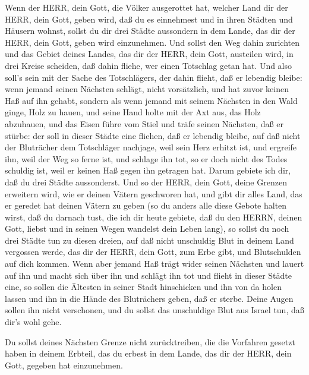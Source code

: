  Wenn der HERR, dein Gott, die Völker ausgerottet hat,
welcher Land dir der HERR, dein Gott, geben wird, daß du es einnehmest
und in ihren Städten und Häusern wohnst,  sollst du dir drei
Städte aussondern in dem Lande, das dir der HERR, dein Gott, geben wird
einzunehmen.  Und sollst den Weg dahin zurichten und das
Gebiet deines Landes, das dir der HERR, dein Gott, austeilen wird, in
drei Kreise scheiden, daß dahin fliehe, wer einen Totschlag getan hat.
 Und also soll's sein mit der Sache des Totschlägers, der
dahin flieht, daß er lebendig bleibe: wenn jemand seinen Nächsten
schlägt, nicht vorsätzlich, und hat zuvor keinen Haß auf ihn gehabt,
 sondern als wenn jemand mit seinem Nächsten in den Wald
ginge, Holz zu hauen, und seine Hand holte mit der Axt aus, das Holz
abzuhauen, und das Eisen führe vom Stiel und träfe seinen Nächsten, daß
er stürbe: der soll in dieser Städte eine fliehen, daß er lebendig
bleibe,  auf daß nicht der Bluträcher dem Totschläger
nachjage, weil sein Herz erhitzt ist, und ergreife ihn, weil der Weg so
ferne ist, und schlage ihn tot, so er doch nicht des Todes schuldig ist,
weil er keinen Haß gegen ihn getragen hat.  Darum gebiete
ich dir, daß du drei Städte aussonderst.  Und so der HERR,
dein Gott, deine Grenzen erweitern wird, wie er deinen Vätern geschworen
hat, und gibt dir alles Land, das er geredet hat deinen Vätern zu geben
 (so du anders alle diese Gebote halten wirst, daß du
darnach tust, die ich dir heute gebiete, daß du den HERRN, deinen Gott,
liebst und in seinen Wegen wandelst dein Leben lang), so sollst du noch
drei Städte tun zu diesen dreien,  auf daß nicht unschuldig
Blut in deinem Land vergossen werde, das dir der HERR, dein Gott, zum
Erbe gibt, und Blutschulden auf dich kommen.  Wenn aber
jemand Haß trägt wider seinen Nächsten und lauert auf ihn und macht sich
über ihn und schlägt ihn tot und flieht in dieser Städte eine,
 so sollen die Ältesten in seiner Stadt hinschicken und ihn
von da holen lassen und ihn in die Hände des Bluträchers geben, daß er
sterbe.  Deine Augen sollen ihn nicht verschonen, und du
sollst das unschuldige Blut aus Israel tun, daß dir's wohl gehe.

 Du sollst deines Nächsten Grenze nicht zurücktreiben, die
die Vorfahren gesetzt haben in deinem Erbteil, das du erbest in dem
Lande, das dir der HERR, dein Gott, gegeben hat einzunehmen.

